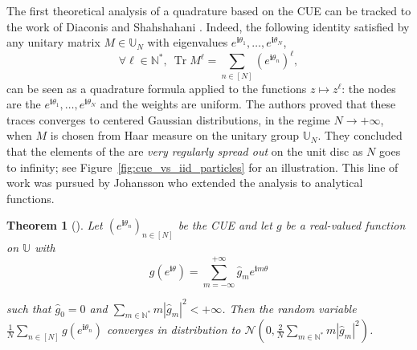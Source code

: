 \documentclass[twoside,11pt]{book}
\newtheorem{theorem}{Theorem}
\numberwithin{theorem}{chapter}
\numberwithin{definition}{chapter}
\numberwithin{proposition}{chapter}
\numberwithin{corollary}{chapter}
\numberwithin{example}{chapter}
\numberwithin{lemma}{chapter}
\DeclareMathOperator{\Tr}{Tr}
\begin{document}


The first theoretical analysis of a  quadrature based on the CUE can be tracked to the work of Diaconis and Shahshahani \citep{DiSh94}. Indeed, the following identity satisfied by any unitary matrix $M \in \mathbb{U}_{N}$ with eigenvalues $e^{\mathbf{i} \theta_{1}}, \dots, e^{\mathbf{i} \theta_{N}}$,
\begin{equation}
\forall \ell \in \mathbb{N}^{*}, \: \Tr M^{\ell}  = \sum\limits_{n \in [N]} (e^{\mathbf{i} \theta_{n}})^{\ell},
\end{equation}
can be seen as a quadrature formula applied to the functions $z \mapsto z^{\ell}$: the nodes are the $e^{\mathbf{i} \theta_{1}}, \dots, e^{\mathbf{i} \theta_{N}}$ and the weights are uniform.
  The authors proved that these traces converges to centered Gaussian distributions, in the regime $N \rightarrow +\infty$, when $M$ is chosen from Haar measure on the unitary group $\mathbb{U}_{N}$. They concluded that the elements of the are \emph{very regularly spread out} on the unit disc as $N$ goes to infinity; see Figure~\ref{fig:cue_vs_iid_particles} for an illustration. This line of work was pursued by Johansson who extended the analysis to analytical functions.


\begin{theorem}[\cite{Joh97}]
Let $(e^{\mathbf{i} \theta_{n}})_{n \in [N]}$ be the CUE and let $g$ be a real-valued function on $\mathbb{U}$ with 
\begin{equation}
g(e^{\mathbf{i}  \theta}) = \sum_{m =-\infty}^{+\infty} \hat{g}_{m}e^{\mathbf{i}  m \theta}
\end{equation}

 such that $\hat{g}_{0} = 0$ and $\sum_{m \in \mathbb{N}^{*}} m|\hat{g}_{m}|^{2} <+\infty$. Then the random variable $ \frac{1}{N}\sum_{n \in [N]} g(e^{\mathbf{i}\theta_{n}})$
converges in distribution to $ \mathcal{N}(0,\frac{2}{N}\sum_{m \in \mathbb{N}^{*}} m|\hat{g}_{m}|^{2})$.
\end{theorem}
\end{document}
